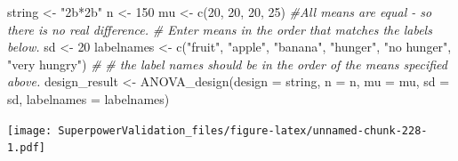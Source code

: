 \documentclass[
]{book}
\newenvironment{Shaded}{\begin{snugshade}}{\end{snugshade}}
\newcommand{\AttributeTok}[1]{\textcolor[rgb]{0.77,0.63,0.00}{#1}}
\newcommand{\CommentTok}[1]{\textcolor[rgb]{0.56,0.35,0.01}{\textit{#1}}}
\newcommand{\ConstantTok}[1]{\textcolor[rgb]{0.00,0.00,0.00}{#1}}
\newcommand{\DecValTok}[1]{\textcolor[rgb]{0.00,0.00,0.81}{#1}}
\newcommand{\FloatTok}[1]{\textcolor[rgb]{0.00,0.00,0.81}{#1}}
\newcommand{\FunctionTok}[1]{\textcolor[rgb]{0.00,0.00,0.00}{#1}}
\newcommand{\NormalTok}[1]{#1}
\newcommand{\OtherTok}[1]{\textcolor[rgb]{0.56,0.35,0.01}{#1}}
\newcommand{\SpecialCharTok}[1]{\textcolor[rgb]{0.00,0.00,0.00}{#1}}
\newcommand{\StringTok}[1]{\textcolor[rgb]{0.31,0.60,0.02}{#1}}
\begin{document}
\begin{Shaded}
\begin{Highlighting}[]
\NormalTok{string }\OtherTok{\textless{}{-}} \StringTok{"2b*2b"}
\NormalTok{n }\OtherTok{\textless{}{-}} \DecValTok{150}
\NormalTok{mu }\OtherTok{\textless{}{-}} \FunctionTok{c}\NormalTok{(}\DecValTok{20}\NormalTok{, }\DecValTok{20}\NormalTok{, }\DecValTok{20}\NormalTok{, }\DecValTok{25}\NormalTok{) }\CommentTok{\#All means are equal {-} so there is no real difference.}
\CommentTok{\# Enter means in the order that matches the labels below.}
\NormalTok{sd }\OtherTok{\textless{}{-}} \DecValTok{20}
\NormalTok{labelnames }\OtherTok{\textless{}{-}} \FunctionTok{c}\NormalTok{(}\StringTok{"fruit"}\NormalTok{, }\StringTok{"apple"}\NormalTok{, }\StringTok{"banana"}\NormalTok{, }
                \StringTok{"hunger"}\NormalTok{, }\StringTok{"no hunger"}\NormalTok{, }\StringTok{"very hungry"}\NormalTok{) }\CommentTok{\#}
\CommentTok{\# the label names should be in the order of the means specified above.}
\NormalTok{design\_result }\OtherTok{\textless{}{-}} \FunctionTok{ANOVA\_design}\NormalTok{(}\AttributeTok{design =}\NormalTok{ string,}
                   \AttributeTok{n =}\NormalTok{ n, }
                   \AttributeTok{mu =}\NormalTok{ mu, }
                   \AttributeTok{sd =}\NormalTok{ sd, }
                   \AttributeTok{labelnames =}\NormalTok{ labelnames)}
\end{Highlighting}
\end{Shaded}

\texttt{[image: SuperpowerValidation\_files/figure-latex/unnamed-chunk-228-1.pdf]}

\begin{Shaded}
\end{Shaded}
\end{document}
